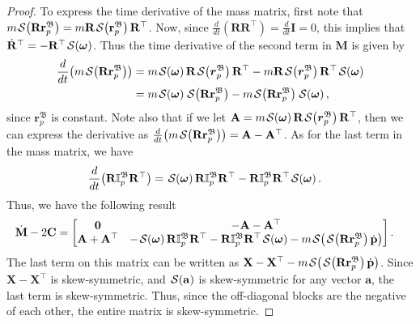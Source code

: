 \begin{proof}
    To express the time derivative of the mass matrix, first note that $m\SL[\mathbf{R}\mathbf{r}_p^\mathfrak{B}] = m\mathbf{R}\SL[\mathbf{r}_p^\mathfrak{B}]\mathbf{R}^\top$. Now, since $\frac{d}{dt}(\mathbf{R}\mathbf{R}^\top)=\frac{d}{dt}\mathbf{I}=0$, this implies that $\dot{\mathbf{R}}^\top = -\mathbf{R}^\top\SL[\boldsymbol{\omega}]$. Thus the time derivative of the second term in $\mathbf{M}$ is given by
    \begin{align}
        \frac{d}{dt}\bigl(m\SL[\mathbf{R}\mathbf{r}_p^\mathfrak{B}]\bigr) &=
        m\SL[\boldsymbol{\omega}]\mathbf{R}\SL[\boldsymbol{r}_p^\mathfrak{B}]\mathbf{R}^\top - m\mathbf{R}\SL[\boldsymbol{r}_p^\mathfrak{B}]\mathbf{R}^\top\SL[\boldsymbol{\omega}]\\
        &= m\SL[\boldsymbol{\omega}]\SL[\mathbf{R}\mathbf{r}_p^\mathfrak{B}] - m\SL[\mathbf{R}\mathbf{r}_p^\mathfrak{B}]\SL[\boldsymbol{\omega}],
    \end{align}
    since $\mathbf{r}_p^\mathfrak{B}$ is constant. Note also that if we let $\mathbf{A} = m\SL[\boldsymbol{\omega}]\mathbf{R}\SL[\boldsymbol{r}_p^\mathfrak{B}]\mathbf{R}^\top$, then we can express the derivative as $\frac{d}{dt}\bigl(m\SL[\mathbf{R}\mathbf{r}_p^\mathfrak{B}]\bigr) = \mathbf{A} - \mathbf{A}^\top$. As for the last term in the mass matrix, we have
    \begin{align}
        \frac{d}{dt}\bigl(\mathbf{R}\mathbb{I}_p^\mathfrak{B}\mathbf{R}^\top\bigr) &=
        \SL[\boldsymbol{\omega}]\mathbf{R}\mathbb{I}_p^\mathfrak{B}\mathbf{R}^\top - \mathbf{R}\mathbb{I}_p^\mathfrak{B}\mathbf{R}^\top\SL[\boldsymbol{\omega}].
    \end{align}
    Thus, we have the following result
    \begin{align}
        \dot{\mathbf{M}} - 2\mathbf{C} &= \begin{bmatrix}
            \mathbf{0} &- \mathbf{A} - \mathbf{A}^\top\\
            \mathbf{A} + \mathbf{A}^\top & -\SL[\boldsymbol{\omega}]\mathbf{R}\mathbb{I}_p^\mathfrak{B}\mathbf{R}^\top - \mathbf{R}\mathbb{I}_p^\mathfrak{B}\mathbf{R}^\top\SL[\boldsymbol{\omega}] -m\SL[\SL[\mathbf {R}\mathbf {r}_p^\mathfrak{B}] \dot{\mathbf{p}}]
        \end{bmatrix}.
    \end{align}
    The last term on this matrix can be written as $\mathbf{X} - \mathbf{X}^\top -m\SL[\SL[\mathbf {R}\mathbf {r}_p^\mathfrak{B}] \dot{\mathbf{p}}]$. Since $\mathbf{X} - \mathbf{X}^\top$ is skew-symmetric, and $\SL[\mathbf{a}]$ is skew-symmetric for any vector $\mathbf{a}$, the last term is skew-symmetric. Thus, since the off-diagonal blocks are the negative of each other, the entire matrix is skew-symmetric.
\end{proof}

